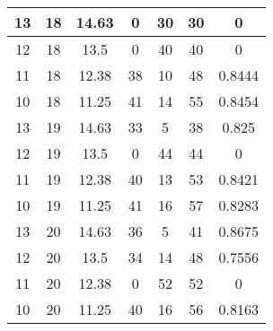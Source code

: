 \documentclass[letterpaper, 12pt]{article}
\begin{document}
\begin{longtable}{|c|c|c|c|c|c|c|}
\hline
13 & 18 & 14.63 & 0 & 30 & 30 & 0 \\
\hline
12 & 18 & 13.5 & 0 & 40 & 40 & 0 \\
\hline
11 & 18 & 12.38 & 38 & 10 & 48 & 0.8444 \\
\hline
10 & 18 & 11.25 & 41 & 14 & 55 & 0.8454 \\
\hline
13 & 19 & 14.63 & 33 & 5 & 38 & 0.825 \\
\hline
12 & 19 & 13.5 & 0 & 44 & 44 & 0 \\
\hline
11 & 19 & 12.38 & 40 & 13 & 53 & 0.8421 \\
\hline
10 & 19 & 11.25 & 41 & 16 & 57 & 0.8283 \\
\hline
13 & 20 & 14.63 & 36 & 5 & 41 & 0.8675 \\
\hline
12 & 20 & 13.5 & 34 & 14 & 48 & 0.7556 \\
\hline
11 & 20 & 12.38 & 0 & 52 & 52 & 0 \\
\hline
10 & 20 & 11.25 & 40 & 16 & 56 & 0.8163 \\
\hline
\end{longtable}
\end{document}
